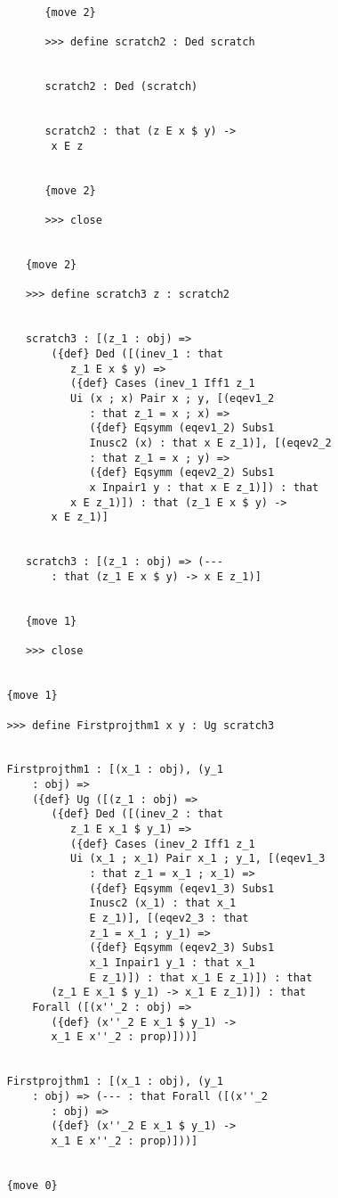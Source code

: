 \documentclass[12pt]{article}
\begin{document}
\begin{verbatim}
         {move 2}

         >>> define scratch2 : Ded scratch


         scratch2 : Ded (scratch)


         scratch2 : that (z E x $ y) -> 
          x E z


         {move 2}

         >>> close


      {move 2}

      >>> define scratch3 z : scratch2


      scratch3 : [(z_1 : obj) => 
          ({def} Ded ([(inev_1 : that 
             z_1 E x $ y) => 
             ({def} Cases (inev_1 Iff1 z_1 
             Ui (x ; x) Pair x ; y, [(eqev1_2 
                : that z_1 = x ; x) => 
                ({def} Eqsymm (eqev1_2) Subs1 
                Inusc2 (x) : that x E z_1)], [(eqev2_2 
                : that z_1 = x ; y) => 
                ({def} Eqsymm (eqev2_2) Subs1 
                x Inpair1 y : that x E z_1)]) : that 
             x E z_1)]) : that (z_1 E x $ y) -> 
          x E z_1)]


      scratch3 : [(z_1 : obj) => (--- 
          : that (z_1 E x $ y) -> x E z_1)]


      {move 1}

      >>> close


   {move 1}

   >>> define Firstprojthm1 x y : Ug scratch3


   Firstprojthm1 : [(x_1 : obj), (y_1 
       : obj) => 
       ({def} Ug ([(z_1 : obj) => 
          ({def} Ded ([(inev_2 : that 
             z_1 E x_1 $ y_1) => 
             ({def} Cases (inev_2 Iff1 z_1 
             Ui (x_1 ; x_1) Pair x_1 ; y_1, [(eqev1_3 
                : that z_1 = x_1 ; x_1) => 
                ({def} Eqsymm (eqev1_3) Subs1 
                Inusc2 (x_1) : that x_1 
                E z_1)], [(eqev2_3 : that 
                z_1 = x_1 ; y_1) => 
                ({def} Eqsymm (eqev2_3) Subs1 
                x_1 Inpair1 y_1 : that x_1 
                E z_1)]) : that x_1 E z_1)]) : that 
          (z_1 E x_1 $ y_1) -> x_1 E z_1)]) : that 
       Forall ([(x''_2 : obj) => 
          ({def} (x''_2 E x_1 $ y_1) -> 
          x_1 E x''_2 : prop)]))]


   Firstprojthm1 : [(x_1 : obj), (y_1 
       : obj) => (--- : that Forall ([(x''_2 
          : obj) => 
          ({def} (x''_2 E x_1 $ y_1) -> 
          x_1 E x''_2 : prop)]))]


   {move 0}


\end{verbatim}
\end{document}
